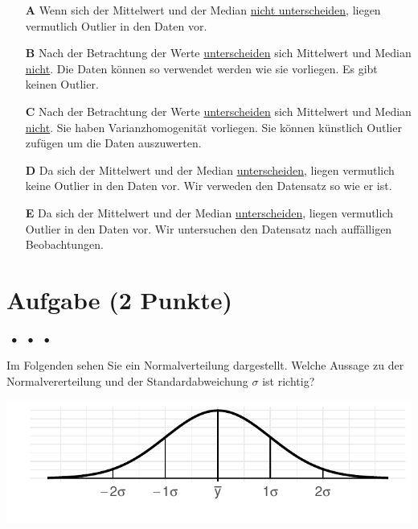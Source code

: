 \documentclass[a4paper, 9pt]{scrartcl}\usepackage[]{graphicx}\usepackage[]{xcolor}
\makeatletter
\def\maxwidth{ %
  \ifdim\Gin@nat@width>\linewidth
    \linewidth
  \else
    \Gin@nat@width
  \fi
}
\makeatother
\begin{document}
\begin{enumerate}
\item [\textbf{A} \msquare] Wenn sich der Mittelwert und der Median \underline{nicht unterscheiden}, liegen vermutlich Outlier in den Daten vor.
\item [\textbf{B} \msquare] Nach der Betrachtung der Werte \underline{unterscheiden} sich Mittelwert und Median \underline{nicht}. Die Daten können so verwendet werden wie sie vorliegen. Es gibt keinen Outlier.
\item [\textbf{C} \msquare] Nach der Betrachtung der Werte \underline{unterscheiden} sich Mittelwert und Median \underline{nicht}. Sie haben Varianzhomogenität vorliegen. Sie können künstlich Outlier zufügen um die Daten auszuwerten.
\item [\textbf{D} \msquare] Da sich der Mittelwert und der Median \underline{unterscheiden}, liegen vermutlich keine Outlier in den Daten vor. Wir verweden den Datensatz so wie er ist.
\item [\textbf{E} \msquare] Da sich der Mittelwert und der Median \underline{unterscheiden}, liegen vermutlich Outlier in den Daten vor. Wir untersuchen den Datensatz nach auffälligen Beobachtungen.
\end{enumerate}

\section{Aufgabe \hfill (2 Punkte)}

\ifcollection
\begin{flushright}
\tiny\vspace{-2Ex}
\textbf{\examinhaltstart}
\exammodulestat $\;\bullet$
\exammodulestatbbv $\;\bullet$
\exammodulestatversuch $\;\bullet$
\exammodulebiostat
\vspace{-1Ex}
\end{flushright}
\fi




Im Folgenden sehen Sie ein Normalverteilung dargestellt. Welche Aussage zu der Normalvererteilung und der Standardabweichung $\sigma$ ist richtig?



{\centering \includegraphics[width=\maxwidth]{img/mc-distribution-02-a-1} 

}
\end{document}
